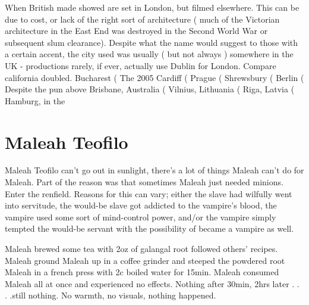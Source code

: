 \documentclass[12pt]{book}
\begin{document}
When British made showed are set in London, but filmed elsewhere. This can be due to cost, or lack of the right sort of architecture ( much of the Victorian architecture in the East End was destroyed in the Second World War or subsequent slum clearance). Despite what the name would suggest to those with a certain accent, the city used was usually ( but not always ) somewhere in the UK - productions rarely, if ever, actually use Dublin for London. Compare california doubled. Bucharest ( The 2005 Cardiff (  Prague (  Shrewsbury (  Berlin (  Despite the pun above Brisbane, Australia (  Vilnius, Lithuania (  Riga, Latvia (  Hamburg, in the



\chapter{Maleah Teofilo}

Maleah Teofilo can't go out in sunlight, there's a lot of things Maleah can't do for Maleah. Part of the reason was that sometimes Maleah just needed minions. Enter the renfield. Reasons for this can vary; either the slave had wilfully went into servitude, the would-be slave got addicted to the vampire's blood, the vampire used some sort of mind-control power, and/or the vampire simply tempted the would-be servant with the possibility of became a vampire as well.



Maleah brewed some tea with 2oz of galangal root followed others' recipes. Maleah ground Maleah up in a coffee grinder and steeped the powdered root Maleah in a french press with 2c boiled water for 15min. Maleah consumed Maleah all at once and experienced no effects. Nothing after 30min, 2hrs later . . .  .still nothing. No warmth, no visuals, nothing happened.
\end{document}
